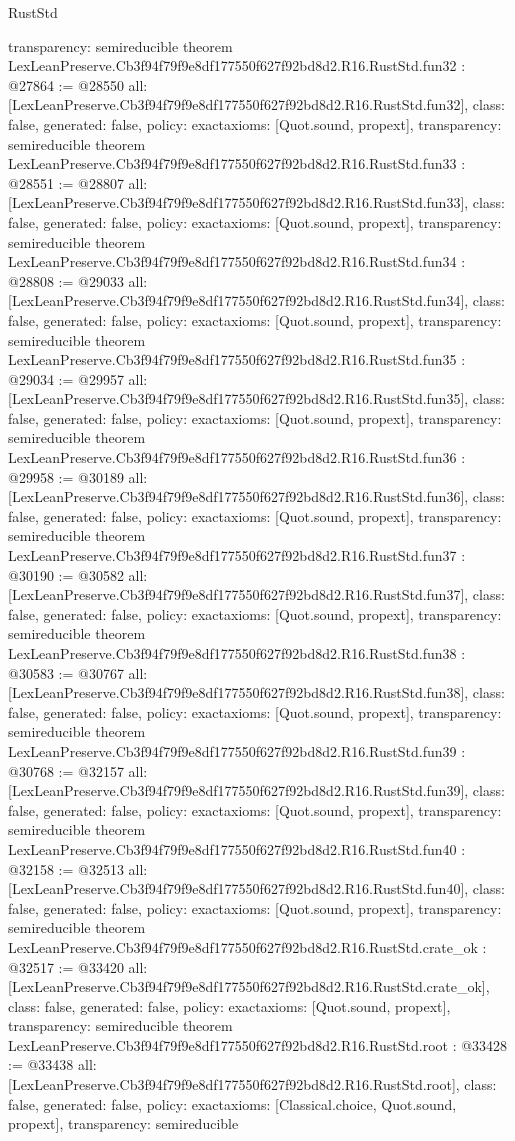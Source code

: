 \begin{lexlean}{RustStd}
\begin{coremodule}
{  transparency: semireducible
}
theorem LexLeanPreserve.Cb3f94f79f9e8df177550f627f92bd8d2.R16.RustStd.fun32 : @27864 := @28550 {
  all: [LexLeanPreserve.Cb3f94f79f9e8df177550f627f92bd8d2.R16.RustStd.fun32],
  class: false,
  generated: false,
  policy: exact{axioms: [Quot.sound, propext]},
  transparency: semireducible
}
theorem LexLeanPreserve.Cb3f94f79f9e8df177550f627f92bd8d2.R16.RustStd.fun33 : @28551 := @28807 {
  all: [LexLeanPreserve.Cb3f94f79f9e8df177550f627f92bd8d2.R16.RustStd.fun33],
  class: false,
  generated: false,
  policy: exact{axioms: [Quot.sound, propext]},
  transparency: semireducible
}
theorem LexLeanPreserve.Cb3f94f79f9e8df177550f627f92bd8d2.R16.RustStd.fun34 : @28808 := @29033 {
  all: [LexLeanPreserve.Cb3f94f79f9e8df177550f627f92bd8d2.R16.RustStd.fun34],
  class: false,
  generated: false,
  policy: exact{axioms: [Quot.sound, propext]},
  transparency: semireducible
}
theorem LexLeanPreserve.Cb3f94f79f9e8df177550f627f92bd8d2.R16.RustStd.fun35 : @29034 := @29957 {
  all: [LexLeanPreserve.Cb3f94f79f9e8df177550f627f92bd8d2.R16.RustStd.fun35],
  class: false,
  generated: false,
  policy: exact{axioms: [Quot.sound, propext]},
  transparency: semireducible
}
theorem LexLeanPreserve.Cb3f94f79f9e8df177550f627f92bd8d2.R16.RustStd.fun36 : @29958 := @30189 {
  all: [LexLeanPreserve.Cb3f94f79f9e8df177550f627f92bd8d2.R16.RustStd.fun36],
  class: false,
  generated: false,
  policy: exact{axioms: [Quot.sound, propext]},
  transparency: semireducible
}
theorem LexLeanPreserve.Cb3f94f79f9e8df177550f627f92bd8d2.R16.RustStd.fun37 : @30190 := @30582 {
  all: [LexLeanPreserve.Cb3f94f79f9e8df177550f627f92bd8d2.R16.RustStd.fun37],
  class: false,
  generated: false,
  policy: exact{axioms: [Quot.sound, propext]},
  transparency: semireducible
}
theorem LexLeanPreserve.Cb3f94f79f9e8df177550f627f92bd8d2.R16.RustStd.fun38 : @30583 := @30767 {
  all: [LexLeanPreserve.Cb3f94f79f9e8df177550f627f92bd8d2.R16.RustStd.fun38],
  class: false,
  generated: false,
  policy: exact{axioms: [Quot.sound, propext]},
  transparency: semireducible
}
theorem LexLeanPreserve.Cb3f94f79f9e8df177550f627f92bd8d2.R16.RustStd.fun39 : @30768 := @32157 {
  all: [LexLeanPreserve.Cb3f94f79f9e8df177550f627f92bd8d2.R16.RustStd.fun39],
  class: false,
  generated: false,
  policy: exact{axioms: [Quot.sound, propext]},
  transparency: semireducible
}
theorem LexLeanPreserve.Cb3f94f79f9e8df177550f627f92bd8d2.R16.RustStd.fun40 : @32158 := @32513 {
  all: [LexLeanPreserve.Cb3f94f79f9e8df177550f627f92bd8d2.R16.RustStd.fun40],
  class: false,
  generated: false,
  policy: exact{axioms: [Quot.sound, propext]},
  transparency: semireducible
}
theorem LexLeanPreserve.Cb3f94f79f9e8df177550f627f92bd8d2.R16.RustStd.crate_ok : @32517 := @33420 {
  all: [LexLeanPreserve.Cb3f94f79f9e8df177550f627f92bd8d2.R16.RustStd.crate_ok],
  class: false,
  generated: false,
  policy: exact{axioms: [Quot.sound, propext]},
  transparency: semireducible
}
theorem LexLeanPreserve.Cb3f94f79f9e8df177550f627f92bd8d2.R16.RustStd.root : @33428 := @33438 {
  all: [LexLeanPreserve.Cb3f94f79f9e8df177550f627f92bd8d2.R16.RustStd.root],
  class: false,
  generated: false,
  policy: exact{axioms: [Classical.choice, Quot.sound, propext]},
  transparency: semireducible
}


\end{coremodule}
\end{lexlean}
